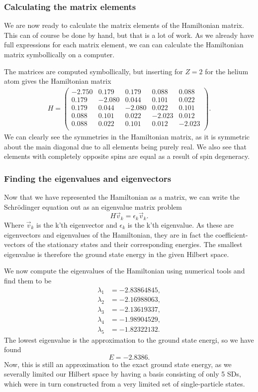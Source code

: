 \documentclass[a4paper, 11pt, notitlepage, english]{article}
\newcommand{\eps}{\epsilon}
\begin{document}
\subsubsection*{Calculating the matrix elements}
We are now ready to calculate the matrix elements of the Hamiltonian matrix. This can of course be done by hand, but that is a lot of work. As we already have full expressions for each matrix element, we can can calculate the Hamiltonian matrix symbollically on a computer. 

The matrices are computed symbollically, but inserting for $Z=2$ for the helium atom gives the Hamiltonian matrix
\begin{align*}
H = \begin{pmatrix}
-2.750 &  0.179 &  0.179 &  0.088 &  0.088 \\
0.179 &  -2.080 &  0.044 &  0.101 &  0.022 \\
0.179 &  0.044 &  -2.080 &  0.022 &  0.101 \\
0.088 &  0.101 &  0.022 &  -2.023 &  0.012 \\
0.088 &  0.022 &  0.101 &  0.012 &  -2.023 \\	
\end{pmatrix}.
\end{align*}
We can clearly see the symmetries in the Hamiltonian matrix, as it is symmetric about the main diagonal due to all elements being purely real. We also see that elements with completely opposite spins are equal as a result of spin degeneracy.

\subsubsection*{Finding the eigenvalues and eigenvectors}
Now that we have represented the Hamiltonian as a matrix, we can write the Schrödinger equation out as an eigenvalue matrix problem
$$H\vec{v}_k = \eps_k\vec{v}_k.$$
Where $\vec{v}_k$ is the k'th eigenvector and $\eps_k$ is the k'th eigenvalue. As these are eigenvectors and eigenvalues of the Hamiltonian, they are in fact the coefficient-vectors of the stationary states and their corresponding energies. The smallest eigenvalue is therefore the ground state energy in the given Hilbert space.

We now compute the eigenvalues of the Hamiltonian using numerical tools and find them to be
\begin{align*}
\lambda_1 &= -2.83864845, \\
\lambda_2 &= -2.16988063, \\
\lambda_3 &= -2.13619337, \\
\lambda_4 &= -1.98904529, \\
\lambda_5 &= -1.82322132. 
\end{align*}
The lowest eigenvalue is the approximation to the ground state energi, so we have found
$$E = -2.8386.$$
Now, this is still an approximation to the exact ground state energy, as we severally limited our Hilbert space by having a basis consisting of only 5 SDs, which were in turn constructed from a very limited set of single-particle states.
\end{document}
